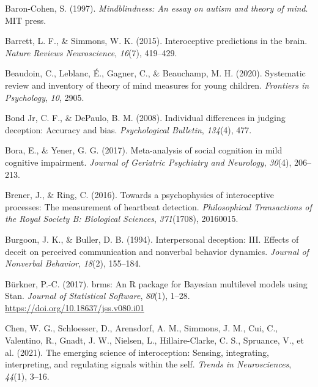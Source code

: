 \documentclass[
  man,floatsintext]{apa6}
\newlength{\cslhangindent}
\newlength{\cslentryspacingunit} %
\newenvironment{CSLReferences}[2] %
 {%
  \setlength{\parindent}{0pt}
  \ifodd #1
  \let\oldpar\par
  \def\par{\hangindent=\cslhangindent\oldpar}
  \fi
  \setlength{\parskip}{#2\cslentryspacingunit}
 }%
 {}
\begin{document}
\hypertarget{refs}{}
\begin{CSLReferences}{1}{0}
\leavevmode{}%
Baron-Cohen, S. (1997). \emph{Mindblindness: An essay on autism and theory of mind}. MIT press.

\leavevmode{}%
Barrett, L. F., \& Simmons, W. K. (2015). Interoceptive predictions in the brain. \emph{Nature Reviews Neuroscience}, \emph{16}(7), 419--429.

\leavevmode{}%
Beaudoin, C., Leblanc, É., Gagner, C., \& Beauchamp, M. H. (2020). Systematic review and inventory of theory of mind measures for young children. \emph{Frontiers in Psychology}, \emph{10}, 2905.

\leavevmode{}%
Bond Jr, C. F., \& DePaulo, B. M. (2008). Individual differences in judging deception: Accuracy and bias. \emph{Psychological Bulletin}, \emph{134}(4), 477.

\leavevmode{}%
Bora, E., \& Yener, G. G. (2017). Meta-analysis of social cognition in mild cognitive impairment. \emph{Journal of Geriatric Psychiatry and Neurology}, \emph{30}(4), 206--213.

\leavevmode{}%
Brener, J., \& Ring, C. (2016). Towards a psychophysics of interoceptive processes: The measurement of heartbeat detection. \emph{Philosophical Transactions of the Royal Society B: Biological Sciences}, \emph{371}(1708), 20160015.

\leavevmode{}%
Burgoon, J. K., \& Buller, D. B. (1994). Interpersonal deception: III. Effects of deceit on perceived communication and nonverbal behavior dynamics. \emph{Journal of Nonverbal Behavior}, \emph{18}(2), 155--184.

\leavevmode{}%
Bürkner, P.-C. (2017). {brms}: An {R} package for {Bayesian} multilevel models using {Stan}. \emph{Journal of Statistical Software}, \emph{80}(1), 1--28. \url{https://doi.org/10.18637/jss.v080.i01}

\leavevmode{}%
Chen, W. G., Schloesser, D., Arensdorf, A. M., Simmons, J. M., Cui, C., Valentino, R., Gnadt, J. W., Nielsen, L., Hillaire-Clarke, C. S., Spruance, V., et al. (2021). The emerging science of interoception: Sensing, integrating, interpreting, and regulating signals within the self. \emph{Trends in Neurosciences}, \emph{44}(1), 3--16.


\end{CSLReferences}
\end{document}
